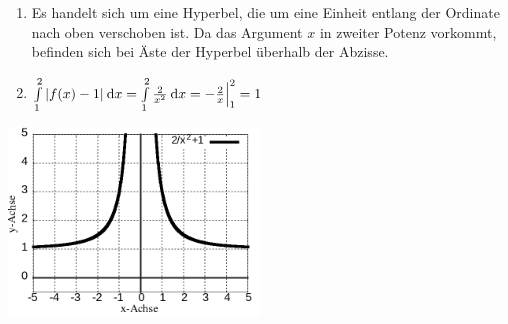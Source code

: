 \item

\begin{enumerate}
\item Es handelt sich um eine Hyperbel, die um eine Einheit entlang der Ordinate nach oben verschoben ist. Da das Argument $x$ in zweiter Potenz vorkommt, befinden sich bei Äste der Hyperbel überhalb der Abzisse.
\item $\int\limits_1^2 |f(x)-1| \:\mathrm{d}{x} = \int\limits_1^2 \frac{2}{x^2} \:\mathrm{d}{x} = -\frac{2}{x} \Big|_1^2 = 1$
\end{enumerate}

\includegraphics[width=0.5\textwidth]{../pool/ex-integral-6-img-a.png}
